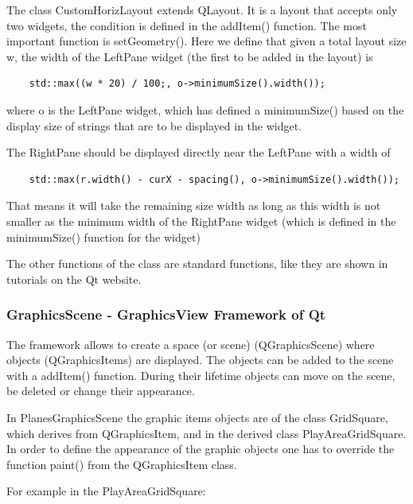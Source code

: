 The class CustomHorizLayout extends QLayout. It is a layout that accepts only two widgets, the condition is defined in the addItem() function. The most important function is setGeometry(). Here we define that given a total layout size w, the width of the LeftPane widget (the first to be added in the layout) is

\begin{lstlisting}
	std::max((w * 20) / 100;, o->minimumSize().width());
\end{lstlisting}

where o is the LeftPane widget, which has defined a minimumSize() based on the display size of strings that are to be displayed in the widget.

The RightPane should be displayed directly near the LeftPane with a width of 

\begin{lstlisting}
	std::max(r.width() - curX - spacing(), o->minimumSize().width());
\end{lstlisting}

That means it will take the remaining size width as long as this width is not smaller as the minimum width of the RightPane widget (which is defined in the minimumSize() function for the widget)

The other functions of the class are standard functions, like they are shown in tutorials on the Qt website.

\subsubsection {GraphicsScene - GraphicsView Framework of Qt}

The framework allows to create a space (or scene) (QGraphicsScene) where objects (QGraphicsItems) are displayed. The objects can be added to the scene with a addItem() function. During their lifetime objects can move on the scene, be deleted or change their appearance.

In PlanesGraphicsScene the graphic items objects are of the class GridSquare, which derives from QGraphicsItem, and in the derived class PlayAreaGridSquare. In order to define the appearance of the graphic objects one has to override the function paint() from the QGraphicsItem class.

For example in the PlayAreaGridSquare:


